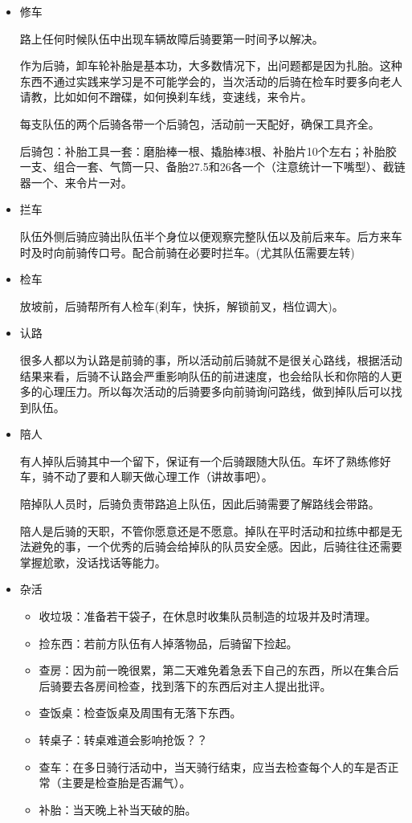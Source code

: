 \documentclass{ctexbook}
\begin{document}
\begin{itemize} 
\item 修车

路上任何时候队伍中出现车辆故障后骑要第一时间予以解决。

作为后骑，卸车轮补胎是基本功，大多数情况下，出问题都是因为扎胎。这种东西不通过实践来学习是不可能学会的，当次活动的后骑在检车时要多向老人请教，比如如何不蹭碟，如何换刹车线，变速线，来令片。

每支队伍的两个后骑各带一个后骑包，活动前一天配好，确保工具齐全。

后骑包：补胎工具一套：磨胎棒一根、撬胎棒3根、补胎片10个左右；补胎胶一支、组合一套、气筒一只、备胎27.5和26各一个（注意统计一下嘴型）、截链器一个、来令片一对。

\item 拦车

队伍外侧后骑应骑出队伍半个身位以便观察完整队伍以及前后来车。后方来车时及时向前骑传口号。配合前骑在必要时拦车。(尤其队伍需要左转)

\item 检车

放坡前，后骑帮所有人检车(刹车，快拆，解锁前叉，档位调大)。

\item 认路

很多人都以为认路是前骑的事，所以活动前后骑就不是很关心路线，根据活动结果来看，后骑不认路会严重影响队伍的前进速度，也会给队长和你陪的人更多的心理压力。所以每次活动的后骑要多向前骑询问路线，做到掉队后可以找到队伍。

\item 陪人

有人掉队后骑其中一个留下，保证有一个后骑跟随大队伍。车坏了熟练修好车，骑不动了要和人聊天做心理工作（讲故事吧）。

陪掉队人员时，后骑负责带路追上队伍，因此后骑需要了解路线会带路。

陪人是后骑的天职，不管你愿意还是不愿意。掉队在平时活动和拉练中都是无法避免的事，一个优秀的后骑会给掉队的队员安全感。因此，后骑往往还需要掌握尬歌，没话找话等能力。

\item 杂活
    \begin{itemize}
    \item 收垃圾：准备若干袋子，在休息时收集队员制造的垃圾并及时清理。
    \item 捡东西：若前方队伍有人掉落物品，后骑留下捡起。
    \item 查房：因为前一晚很累，第二天难免着急丢下自己的东西，所以在集合后后骑要去各房间检查，找到落下的东西后对主人提出批评。
    \item 查饭桌：检查饭桌及周围有无落下东西。
    \item 转桌子：转桌难道会影响抢饭？？
    \item 查车：在多日骑行活动中，当天骑行结束，应当去检查每个人的车是否正常（主要是检查胎是否漏气）。
    \item 补胎：当天晚上补当天破的胎。
    \end{itemize}
\end{itemize}
\end{document}
